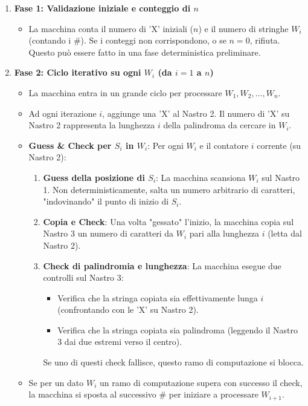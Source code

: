 \documentclass[a4paper]{article}
\begin{document}
\begin{enumerate}
    \item \textbf{Fase 1: Validazione iniziale e conteggio di $n$}
        \begin{itemize}
            \item La macchina conta il numero di 'X' iniziali ($n$) e il numero di stringhe $W_i$ (contando i $\#$). Se i conteggi non corrispondono, o se $n=0$, rifiuta. Questo può essere fatto in una fase deterministica preliminare.
        \end{itemize}

    \item \textbf{Fase 2: Ciclo iterativo su ogni $W_i$ (da $i=1$ a $n$)}
        \begin{itemize}
            \item La macchina entra in un grande ciclo per processare $W_1, W_2, \dots, W_n$.
            \item Ad ogni iterazione $i$, aggiunge una 'X' al Nastro 2. Il numero di 'X' su Nastro 2 rappresenta la lunghezza $i$ della palindroma da cercare in $W_i$.
            \item \textbf{Guess \& Check per $S_i$ in $W_i$}: Per ogni $W_i$ e il contatore $i$ corrente (su Nastro 2):
                \begin{enumerate}
                    \item \textbf{Guess della posizione di $S_i$}: La macchina scansiona $W_i$ sul Nastro 1. Non deterministicamente, salta un numero arbitrario di caratteri, "indovinando" il punto di inizio di $S_i$.
                    
                    \item \textbf{Copia e Check}: Una volta "gessato" l'inizio, la macchina copia sul Nastro 3 un numero di caratteri da $W_i$ pari alla lunghezza $i$ (letta dal Nastro 2).
                    
                    \item \textbf{Check di palindromia e lunghezza}: La macchina esegue due controlli sul Nastro 3:
                    \begin{itemize}
                        \item Verifica che la stringa copiata sia effettivamente lunga $i$ (confrontando con le 'X' su Nastro 2).
                        \item Verifica che la stringa copiata sia palindroma (leggendo il Nastro 3 dai due estremi verso il centro).
                    \end{itemize}
                    Se uno di questi check fallisce, questo ramo di computazione si blocca.
                \end{enumerate}
            \item Se per un dato $W_i$ un ramo di computazione supera con successo il check, la macchina si sposta al successivo $\#$ per iniziare a processare $W_{i+1}$.
        \end{itemize}


\end{enumerate}
\end{document}
